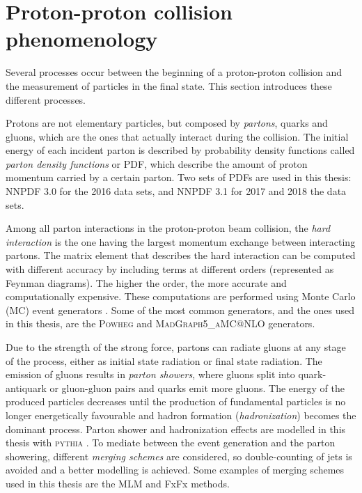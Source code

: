 \documentclass[../main.tex]{subfiles}
\begin{document}
\section{Proton-proton collision phenomenology}
\label{theo:sec:pp}

Several processes occur between the beginning of a proton-proton collision and the measurement of particles in the final state. This section introduces these different processes.

Protons are not elementary particles, but composed by \textit{partons}, quarks and gluons, which are the ones that actually interact during the collision. The initial energy of each incident parton is described by probability density functions called \textit{parton density functions} or PDF, which describe the amount of proton momentum carried by a certain parton. Two sets of PDFs are used in this thesis: NNPDF 3.0 \cite{intro:theo:pdf16} for the 2016 data sets, and NNPDF 3.1 \cite{intro:theo:pdf1718} for 2017 and 2018 the data sets.

Among all parton interactions in the proton-proton beam collision, the \textit{hard interaction} is the one having the largest momentum exchange between interacting partons. The matrix element that describes the hard interaction can be computed with different accuracy by including terms at different orders (represented as Feynman diagrams). The higher the order, the more accurate and computationally expensive. These computations are performed using Monte Carlo (MC) event generators \cite{intro:theo:mc}. Some of the most common generators, and the ones used in this thesis, are the \textsc{Powheg} \cite{hh:analysis:powheg} and \textsc{MadGraph5\_aMC@NLO} \cite{hh:analysis:madgraph} generators.

Due to the strength of the strong force, partons can radiate gluons at any stage of the process, either as initial state radiation or final state radiation. The emission of gluons results in \textit{parton showers}, where gluons split into quark-antiquark or gluon-gluon pairs and quarks emit more gluons. The energy of the produced particles decreases until the production of fundamental particles is no longer energetically favourable and hadron formation (\textit{hadronization}) becomes the dominant process. Parton shower and hadronization effects are modelled in this thesis with \textsc{pythia} \cite{intro:theo:pythia}. To mediate between the event generation and the parton showering, different \textit{merging schemes} are considered, so double-counting of jets is avoided and a better modelling is achieved. Some examples of merging schemes used in this thesis are the MLM \cite{intro:theo:mlm} and FxFx \cite{intro:theo:fxfx} methods.
\end{document}
